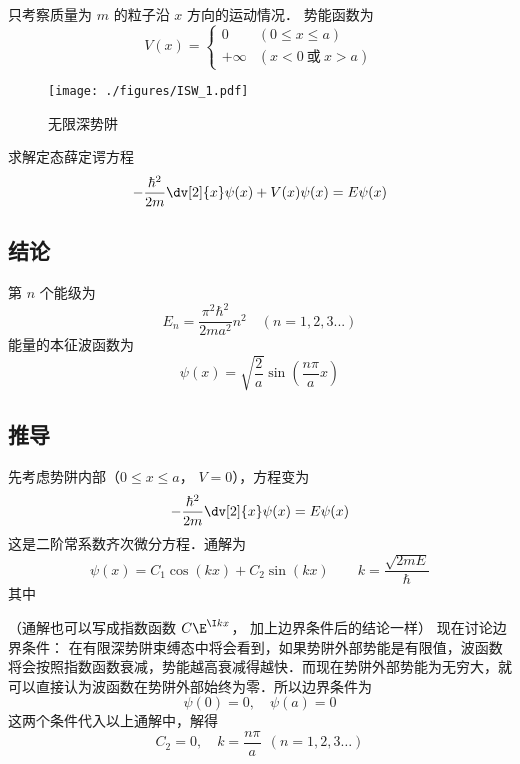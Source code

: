 

只考察质量为 $m$ 的粒子沿 $x$ 方向的运动情况．%
势能函数为
\begin{equation}
V(x) =
\begin{cases}
0 \quad &(0 \leqslant x \leqslant a)\\
+\infty  &(x < 0 \ \text{或}\  x > a)
\end{cases}
\end{equation}

\begin{figure}[ht]
\centering
\texttt{[image: ./figures/ISW\_1.pdf]}
\caption{无限深势阱} \label{ISW_fig1}
\end{figure}
求解定态薛定谔方程 %
\begin{equation}
-\frac{\hbar ^2}{2m} \dv[2]{x} \psi(x) + V(x)\psi(x) = E\psi(x)
\end{equation} 
\subsection{结论} 

第 $n$ 个能级为
\begin{equation}
E_n = \frac{\pi^2 \hbar^2}{2m a^2} n^2 \quad (n = 1,2,3...)
\end{equation}
能量的本征波函数为
\begin{equation}\label{ISW_eq1}
\psi(x) = \sqrt{\frac{2}{a}} \sin(\frac{n\pi }{a} x)
\end{equation}

\subsection{推导} 
先考虑势阱内部（$0 \leqslant x \leqslant a$， $V = 0$），方程变为
\begin{equation}
-\frac{\hbar^2}{2m} \dv[2]{x} \psi(x) = E\psi(x) 
\end{equation}
这是二阶常系数齐次微分方程．通解为
\begin{equation}
\psi(x) = C_1\cos(kx) + C_2 \sin(kx) \qquad
k = \frac{\sqrt{2mE}}{\hbar}
\end{equation} 
其中

（通解也可以写成指数函数 $C\E^{\I kx}$， 加上边界条件后的结论一样）
现在讨论边界条件： 在有限深势阱束缚态中将会看到，如果势阱外部势能是有限值，波函数将会按照指数函数衰减，势能越高衰减得越快．而现在势阱外部势能为无穷大，就可以直接认为波函数在势阱外部始终为零．所以边界条件为
\begin{equation}
\psi(0) = 0, \quad \psi(a) = 0
\end{equation}
这两个条件代入以上通解中，解得
\begin{equation}
C_2 = 0, \quad k = \frac{n\pi}{a}  \ \ (n = 1,2,3\dots)
\end{equation}

